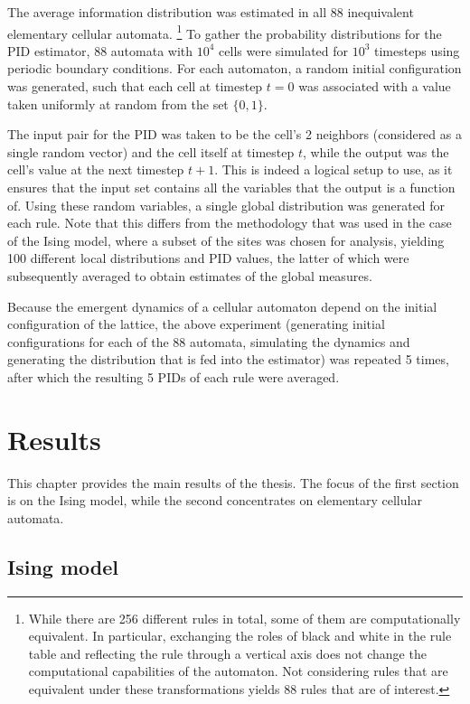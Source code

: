 \documentclass[12pt]{article}
\begin{document}
The average information distribution was estimated in all 88 inequivalent elementary cellular automata. \footnote{While there are 256 different rules in total, some of them are computationally equivalent. In particular, exchanging the roles of black and white in the rule table and reflecting the rule through a vertical axis does not change the computational capabilities of the automaton. Not considering rules that are equivalent under these transformations yields 88 rules that are of interest.} To gather the probability distributions for the PID estimator, 88 automata with $10^4$ cells were simulated for $10^3$ timesteps using periodic boundary conditions. For each automaton, a random initial configuration was generated, such that each cell at timestep $t=0$ was associated with a value taken uniformly at random from the set $\{0,1\}$.

The input pair for the PID was taken to be the cell's 2 neighbors (considered as a single random vector) and the cell itself at timestep $t$, while the output was the cell's value at the next timestep $t+1$. This is indeed a logical setup to use, as it ensures that the input set contains all the variables that the output is a function of. Using these random variables, a single global distribution was generated for each rule. Note that this differs from the methodology that was used in the case of the Ising model, where a subset of the sites was chosen for analysis, yielding 100 different local distributions and PID values, the latter of which were subsequently averaged to obtain estimates of the global measures.

Because the emergent dynamics of a cellular automaton depend on the initial configuration of the lattice, the above experiment (generating initial configurations for each of the 88 automata, simulating the dynamics and generating the distribution that is fed into the estimator) was repeated 5 times, after which the resulting 5 PIDs of each rule were averaged.  

\newpage
\section{Results}

This chapter provides the main results of the thesis. The focus of the first section is on the Ising model, while the second concentrates on elementary cellular automata. 

\subsection{Ising model}
\end{document}
